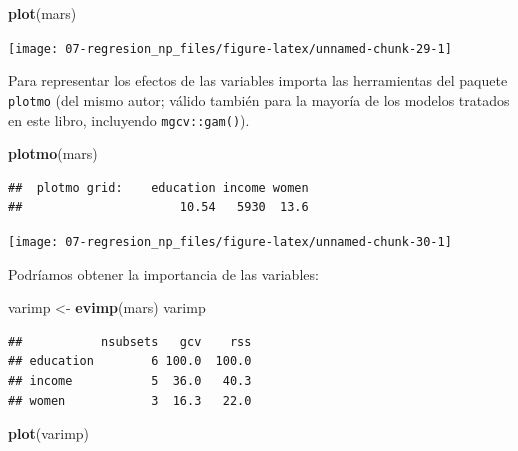 \documentclass[
]{book}
\newenvironment{Shaded}{\begin{snugshade}}{\end{snugshade}}
\newcommand{\KeywordTok}[1]{\textcolor[rgb]{0.13,0.29,0.53}{\textbf{#1}}}
\newcommand{\NormalTok}[1]{#1}
\newcommand{\StringTok}[1]{\textcolor[rgb]{0.31,0.60,0.02}{#1}}
\theoremstyle{break}
\theoremstyle{definition}
\theoremstyle{definition}
\theoremstyle{definition}
\theoremstyle{remark}
\begin{document}
\begin{Shaded}
\begin{Highlighting}[]
\KeywordTok{plot}\NormalTok{(mars)}
\end{Highlighting}
\end{Shaded}

\begin{center}\texttt{[image: 07-regresion\_np\_files/figure-latex/unnamed-chunk-29-1]} \end{center}

Para representar los efectos de las variables importa las herramientas del paquete \texttt{plotmo} (del mismo autor; válido también para la mayoría de los modelos tratados en este libro, incluyendo \texttt{mgcv::gam()}).

\begin{Shaded}
\begin{Highlighting}[]
\KeywordTok{plotmo}\NormalTok{(mars)}
\end{Highlighting}
\end{Shaded}

\begin{verbatim}
##  plotmo grid:    education income women
##                      10.54   5930  13.6
\end{verbatim}

\begin{center}\texttt{[image: 07-regresion\_np\_files/figure-latex/unnamed-chunk-30-1]} \end{center}

Podríamos obtener la importancia de las variables:

\begin{Shaded}
\begin{Highlighting}[]
\NormalTok{varimp <-}\StringTok{ }\KeywordTok{evimp}\NormalTok{(mars)}
\NormalTok{varimp}
\end{Highlighting}
\end{Shaded}

\begin{verbatim}
##           nsubsets   gcv    rss
## education        6 100.0  100.0
## income           5  36.0   40.3
## women            3  16.3   22.0
\end{verbatim}

\begin{Shaded}
\begin{Highlighting}[]
\KeywordTok{plot}\NormalTok{(varimp)}
\end{Highlighting}
\end{Shaded}
\end{document}
